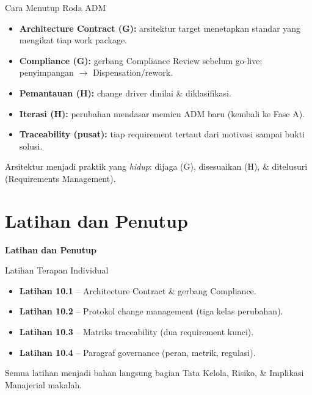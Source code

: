 \documentclass[aspectratio=169, table]{beamer}
\newcommand{\sectionframe}[1]{%
  \begin{frame}{\hfill}
    \centering
    \Huge{\textbf{#1}}
  \end{frame}
}
\newcommand{\takeaway}[1]{%
  \vspace{4pt}
  {\footnotesize #1}
}
\begin{document}
\begin{frame}{Cara Menutup Roda ADM}
  \vspace{4pt}
  \footnotesize
  \begin{itemize}\setlength{\itemsep}{2.5pt}
    \item \textbf{Architecture Contract (G):} arsitektur target menetapkan standar
          yang mengikat tiap work package.
    \item \textbf{Compliance (G):} gerbang Compliance Review sebelum go-live;
          penyimpangan $\rightarrow$ Dispensation/rework.
    \item \textbf{Pemantauan (H):} change driver dinilai \& diklasifikasi.
    \item \textbf{Iterasi (H):} perubahan mendasar memicu ADM baru (kembali ke
          Fase A).
    \item \textbf{Traceability (pusat):} tiap requirement tertaut dari motivasi
          sampai bukti solusi.
  \end{itemize}
  \takeaway{Arsitektur menjadi praktik yang \emph{hidup}: dijaga (G), disesuaikan (H),
  \& ditelusuri (Requirements Management).}
\end{frame}

\section{Latihan dan Penutup}
\sectionframe{Latihan dan Penutup}

\begin{frame}{Latihan Terapan Individual}
  \vspace{8pt}
  \begin{itemize}
    \item \textbf{Latihan 10.1} -- Architecture Contract \& gerbang Compliance.
    \item \textbf{Latihan 10.2} -- Protokol change management (tiga kelas
          perubahan).
    \item \textbf{Latihan 10.3} -- Matriks traceability (dua requirement kunci).
    \item \textbf{Latihan 10.4} -- Paragraf governance (peran, metrik, regulasi).
  \end{itemize}
  \takeaway{Semua latihan menjadi bahan langsung bagian Tata Kelola, Risiko, \&
  Implikasi Manajerial makalah.}
\end{frame}
\end{document}
